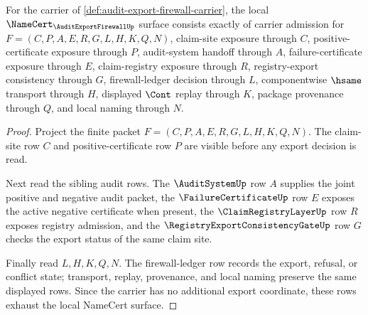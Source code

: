 \begin{theorem}
\label{thm:audit-export-firewall-namecert-obligations}
For the carrier of \autoref{def:audit-export-firewall-carrier}, the local $\NameCert_{\AuditExportFirewallUp}$ surface consists exactly of carrier admission for $F=(C,P,A,E,R,G,L,H,K,Q,N)$, claim-site exposure through $C$, positive-certificate exposure through $P$, audit-system handoff through $A$, failure-certificate exposure through $E$, claim-registry exposure through $R$, registry-export consistency through $G$, firewall-ledger decision through $L$, componentwise $\hsame$ transport through $H$, displayed $\Cont$ replay through $K$, package provenance through $Q$, and local naming through $N$.
\end{theorem}
\begin{proof}
Project the finite packet $F=(C,P,A,E,R,G,L,H,K,Q,N)$. The claim-site row $C$ and positive-certificate row $P$ are visible before any export decision is read.

Next read the sibling audit rows. The $\AuditSystemUp$ row $A$ supplies the joint positive and negative audit packet, the $\FailureCertificateUp$ row $E$ exposes the active negative certificate when present, the $\ClaimRegistryLayerUp$ row $R$ exposes registry admission, and the $\RegistryExportConsistencyGateUp$ row $G$ checks the export status of the same claim site.

Finally read $L,H,K,Q,N$. The firewall-ledger row records the export, refusal, or conflict state; transport, replay, provenance, and local naming preserve the same displayed rows. Since the carrier has no additional export coordinate, these rows exhaust the local NameCert surface.
\end{proof}

